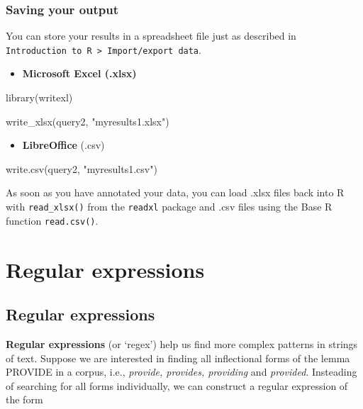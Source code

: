 \documentclass[
  11pt,
  letterpaper,
  DIV=11,
  numbers=noendperiod]{scrreprt}
\newenvironment{Shaded}{\begin{snugshade}}{\end{snugshade}}
\newcommand{\FunctionTok}[1]{\textcolor[rgb]{0.28,0.35,0.67}{#1}}
\newcommand{\NormalTok}[1]{\textcolor[rgb]{0.00,0.23,0.31}{#1}}
\newcommand{\StringTok}[1]{\textcolor[rgb]{0.13,0.47,0.30}{#1}}
\providecommand{\tightlist}{%
  \setlength{\itemsep}{0pt}\setlength{\parskip}{0pt}}\usepackage{longtable,booktabs,array}
\begin{document}
\subsection{Saving your output}\label{saving-your-output}

You can store your results in a spreadsheet file just as described in
\texttt{Introduction\ to\ R\ \textgreater{}\ Import/export\ data}.

\begin{itemize}
\tightlist
\item
  \textbf{Microsoft Excel (.xlsx)}
\end{itemize}

\begin{Shaded}
\begin{Highlighting}[]
\FunctionTok{library}\NormalTok{(writexl)}

\FunctionTok{write\_xlsx}\NormalTok{(query2, }\StringTok{"myresults1.xlsx"}\NormalTok{)}
\end{Highlighting}
\end{Shaded}

\begin{itemize}
\tightlist
\item
  \textbf{LibreOffice} (.csv)
\end{itemize}

\begin{Shaded}
\begin{Highlighting}[]
\FunctionTok{write.csv}\NormalTok{(query2, }\StringTok{"myresults1.csv"}\NormalTok{)}
\end{Highlighting}
\end{Shaded}

As soon as you have annotated your data, you can load .xlsx files back
into R with \texttt{read\_xlsx()} from the \texttt{readxl} package and
.csv files using the Base R function \texttt{read.csv()}.

\chapter{Regular expressions}\label{regular-expressions}

\section{Regular expressions}\label{regular-expressions-1}

\textbf{Regular expressions} (or `regex') help us find more complex
patterns in strings of text. Suppose we are interested in finding all
inflectional forms of the lemma PROVIDE in a corpus, i.e.,
\emph{provide, provides, providing} and \emph{provided}. Insteading of
searching for all forms individually, we can construct a regular
expression of the form
\end{document}
